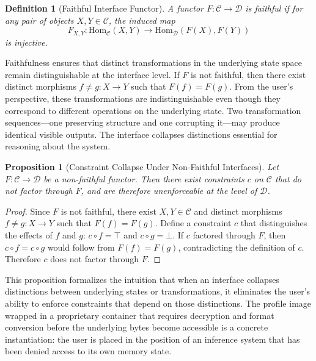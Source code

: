 \documentclass[12pt, oneside]{article}
\newtheorem{definition}{Definition}
\newtheorem{proposition}{Proposition}
\begin{document}
\begin{definition}[Faithful Interface Functor]
A functor $F : \mathcal{C} \to \mathcal{D}$ is faithful if for any pair of objects $X, Y \in \mathcal{C}$, the induced map
\begin{equation}
  F_{X,Y} : \mathrm{Hom}_{\mathcal{C}}(X, Y) \to \mathrm{Hom}_{\mathcal{D}}(F(X), F(Y))
\end{equation}
is injective.
\end{definition}

Faithfulness ensures that distinct transformations in the underlying state space remain distinguishable at the interface level. If $F$ is not faithful, then there exist distinct morphisms $f \neq g : X \to Y$ such that $F(f) = F(g)$. From the user's perspective, these transformations are indistinguishable even though they correspond to different operations on the underlying state. Two transformation sequences---one preserving structure and one corrupting it---may produce identical visible outputs. The interface collapses distinctions essential for reasoning about the system.

\begin{proposition}[Constraint Collapse Under Non-Faithful Interfaces]
Let $F : \mathcal{C} \to \mathcal{D}$ be a non-faithful functor. Then there exist constraints $c$ on $\mathcal{C}$ that do not factor through $F$, and are therefore unenforceable at the level of $\mathcal{D}$.
\end{proposition}

\begin{proof}
Since $F$ is not faithful, there exist $X, Y \in \mathcal{C}$ and distinct morphisms $f \neq g : X \to Y$ such that $F(f) = F(g)$. Define a constraint $c$ that distinguishes the effects of $f$ and $g$: $c \circ f = \top$ and $c \circ g = \bot$. If $c$ factored through $F$, then $c \circ f = c \circ g$ would follow from $F(f) = F(g)$, contradicting the definition of $c$. Therefore $c$ does not factor through $F$.
\end{proof}

This proposition formalizes the intuition that when an interface collapses distinctions between underlying states or transformations, it eliminates the user's ability to enforce constraints that depend on those distinctions. The profile image wrapped in a proprietary container that requires decryption and format conversion before the underlying bytes become accessible is a concrete instantiation: the user is placed in the position of an inference system that has been denied access to its own memory state.
\end{document}
